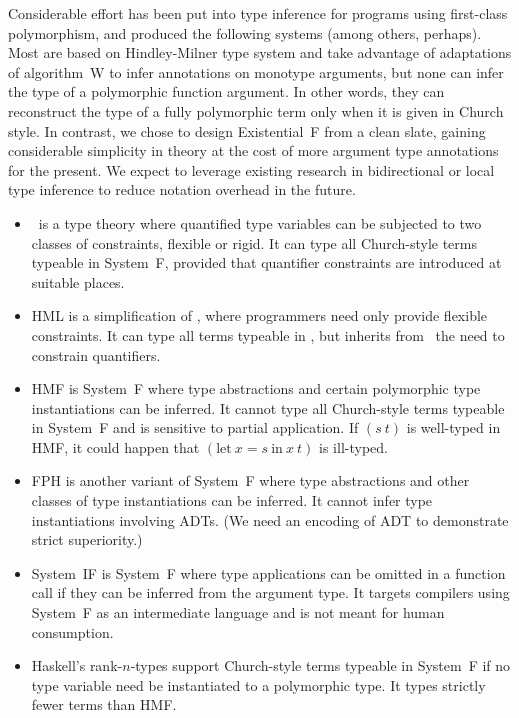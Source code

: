 \documentclass{amsart}
\begin{document}
\nc{}

Considerable effort has been put into type inference for programs
using first-class polymorphism, and produced the following
systems (among others, perhaps). Most are based on Hindley-Milner
type system and take advantage of adaptations of algorithm~W to
infer annotations on monotype arguments, but none can infer the
type of a polymorphic function argument. In other words, they can
reconstruct the type of a fully polymorphic term only when it is
given in Church style. In contrast, we chose to design
Existential~F from a clean slate, gaining considerable simplicity
in theory at the cost of more argument type annotations for the
present. We expect to leverage existing research in bidirectional
or local type inference to reduce notation overhead in the
future.
\begin{itemize}
\item \MLF\ is a type theory where quantified type variables can
be subjected to two classes of constraints, flexible or rigid. It
can type all Church-style terms typeable in System~F, provided
that quantifier constraints are introduced at suitable places.

\item HML is a simplification of \MLF, where programmers need
only provide flexible constraints. It can type all terms typeable
in \MLF, but inherits from \MLF\ the need to constrain
quantifiers.

\item HMF is System~F where type abstractions and certain
polymorphic type instantiations can be inferred. It cannot type
all Church-style terms typeable in System~F and is sensitive to
partial application. If $(s~t)$ is well-typed in HMF, it could
happen that $(\mathrm{let}~x=s~\mathrm{in}~x~t)$ is ill-typed.


\item FPH is another variant of System~F where type abstractions
and other classes of type instantiations can be inferred. It
cannot infer type instantiations involving ADTs. (We need an
encoding of ADT to demonstrate strict superiority.)

\item System~IF is System~F where type applications can be
omitted in a function call if they can be inferred from the
argument type. It targets compilers using System~F as an
intermediate language and is not meant for human consumption.

\item Haskell's rank-$n$-types support Church-style terms
typeable in System~F if no type variable need be instantiated to
a polymorphic type. It types strictly fewer terms than HMF.
\end{itemize}
\end{document}
